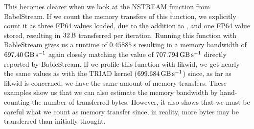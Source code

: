 This becomes clearer when we look at the NSTREAM function from BabelStream. 
If we count the memory transfers of this function, we explicitly count it as three FP64 values loaded, due to the addition to , and one FP64 value stored, resulting in $\SI{32}{\byte}$ transferred per iteration. 
Running this function with BableStream gives us a runtime of $\SI{0.45885}{\second}$ resulting in a memory bandwidth of $\SI{697.40}{\giga\byte\per\second}$ again closely matching the value of $\SI{707.794}{\giga\byte\per\second}$ directly reported by BableStream. 
If we profile this function with likwid, we get nearly the same values as with the TRIAD kernel ($\SI{699.684}{\giga\byte\per\second}$) since, as far as likwid is concerned, we have the same amount of memory transfers. 
These examples show us that we can also estimate the memory bandwidth by hand-counting the number of transferred bytes. 
However, it also shows that we must be careful what we count as memory transfer since, in reality, more bytes may be transferred than initially thought. 





